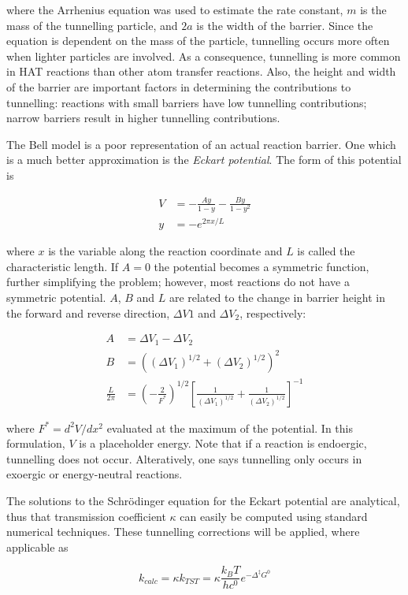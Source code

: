 \noindent where the Arrhenius equation was used to estimate the rate constant, $m$ is the mass of the tunnelling particle, and $2a$ is the width of the barrier. Since the equation is dependent on the mass of the particle, tunnelling occurs more often when lighter particles are involved. As a consequence, tunnelling is more common in HAT reactions than other atom transfer reactions. Also, the height and width of the barrier are important factors in determining the contributions to tunnelling: reactions with small barriers have low tunnelling contributions; narrow barriers result in higher tunnelling contributions.

The Bell model is a poor representation of an actual reaction barrier. One which is a much better approximation is the \emph{Eckart potential}.\cite{Johnston1962} The form of this potential is

\begin{align}
  V &= -\frac{Ay}{1-y} - \frac{By}{1-y^2} \\
  y &= -e^{2\pi x/L}
\end{align}

\noindent where $x$ is the variable along the reaction coordinate and $L$ is called the characteristic length. If $A=0$ the potential becomes a symmetric function, further simplifying the problem; however, most reactions do not have a symmetric potential. $A$, $B$ and $L$ are related to the change in barrier height in the forward and reverse direction, $\Delta V1$ and $\Delta V_2$, respectively:

\begin{align}
  A &= \Delta V_1 - \Delta V_2 \\
  B &= ((\Delta V_1)^{1/2} + (\Delta V_2)^{1/2})^2 \\
 \frac{L}{2\pi} &= (-\frac{2}{F^*})^{1/2} [\frac{1}{(\Delta V_1)^{1/2}} +
      \frac{1}{(\Delta V_2)^{1/2}}]^{-1}
\end{align}

\noindent where $F^* = d^2V/dx^2$ evaluated at the maximum of the potential. In this formulation, $V$ is a placeholder energy. Note that if a reaction is endoergic, tunnelling does not occur. Alteratively, one says tunnelling only occurs in exoergic or energy-neutral reactions.

The solutions to the Schr{\"o}dinger equation for the Eckart potential are analytical, thus that transmission coefficient $\kappa$ can easily be computed using standard numerical techniques. These tunnelling corrections will be applied, where applicable as

\begin{equation}
  k_{calc} = \kappa k_{TST} = \kappa
\frac{k_BT}{hc^0}e^{-\Delta^\ddagger G^0}
\end{equation}
